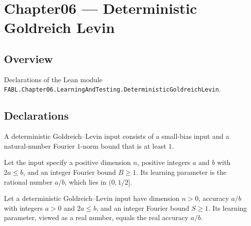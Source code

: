 \chapter{Chapter06 — Deterministic Goldreich Levin}
\section{Overview}

Declarations of the Lean module \texttt{FABL.Chapter06.LearningAndTesting.DeterministicGoldreichLevin}.

\section{Declarations}

\begin{definition}
\label{FABL.DeterministicGoldreichLevinInput}
\leanok
{}
A deterministic Goldreich–Levin input consists of a small-bias input and a
natural-number Fourier $1$-norm bound that is at least $1$.
\end{definition}

\begin{definition}
\label{FABL.DeterministicGoldreichLevinInput.learningParameter}
\leanok
{}
Let the input specify a positive dimension $n$, positive integers $a$ and $b$ with
$2a\le b$, and an integer Fourier bound $B\ge1$. Its learning parameter is the rational
number $a/b$, which lies in $(0,1/2]$.
\end{definition}

\begin{theorem}
\label{FABL.DeterministicGoldreichLevinInput.learningParameter_cast}
\leanok
{}
Let a deterministic Goldreich–Levin input have dimension $n>0$, accuracy $a/b$ with
integers $a>0$ and $2a\le b$, and an integer Fourier bound $S\ge1$. Its learning
parameter, viewed as a real number, equals the real accuracy $a/b$.
\end{theorem}

